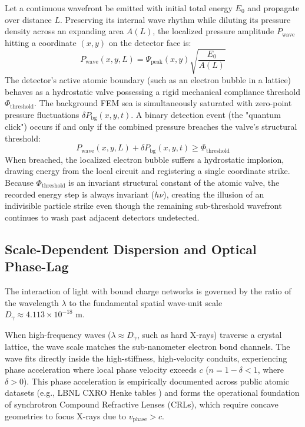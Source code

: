 \documentclass[11pt,a4paper]{article}
\begin{document}
	Let a continuous wavefront be emitted with initial total energy $E_0$ and propagate over distance $L$. Preserving its internal wave rhythm while diluting its pressure density across an expanding area $A(L)$, the localized pressure amplitude $P_{\text{wave}}$ hitting a coordinate $(x,y)$ on the detector face is:
	\begin{equation}
		P_{\text{wave}}(x,y,L) = \Psi_{\text{peak}}(x,y) \sqrt{\frac{E_0}{A(L)}}
	\end{equation}
	The detector's active atomic boundary (such as an electron bubble in a lattice) behaves as a hydrostatic valve possessing a rigid mechanical compliance threshold $\Phi_{\text{threshold}}$. The background FEM sea is simultaneously saturated with zero-point pressure fluctuations $\delta P_{\text{bg}}(x,y,t)$. A binary detection event (the "quantum click") occurs if and only if the combined pressure breaches the valve's structural threshold:
	\begin{equation}
		P_{\text{wave}}(x,y,L) + \delta P_{\text{bg}}(x,y,t) \ge \Phi_{\text{threshold}}
	\end{equation}
	When breached, the localized electron bubble suffers a hydrostatic implosion, drawing energy from the local circuit and registering a single coordinate strike. Because $\Phi_{\text{threshold}}$ is an invariant structural constant of the atomic valve, the recorded energy step is always invariant ($h\nu$), creating the illusion of an indivisible particle strike even though the remaining sub-threshold wavefront continues to wash past adjacent detectors undetected.
	
	\subsection{Scale-Dependent Dispersion and Optical Phase-Lag}
	The interaction of light with bound charge networks is governed by the ratio of the wavelength $\lambda$ to the fundamental spatial wave-unit scale $D_\gamma \approx 4.113 \times 10^{-18}\text{ m}$. 
	
	When high-frequency waves ($\lambda \approx D_\gamma$, such as hard X-rays) traverse a crystal lattice, the wave scale matches the sub-nanometer electron bond channels. The wave fits directly inside the high-stiffness, high-velocity conduits, experiencing phase acceleration where local phase velocity exceeds $c$ ($n = 1 - \delta < 1$, where $\delta > 0$). This phase acceleration is empirically documented across public atomic datasets (e.g., LBNL CXRO Henke tables \cite{henke1993}) and forms the operational foundation of synchrotron Compound Refractive Lenses (CRLs), which require concave geometries to focus X-rays due to $v_{\text{phase}} > c$.
	
\end{document}
